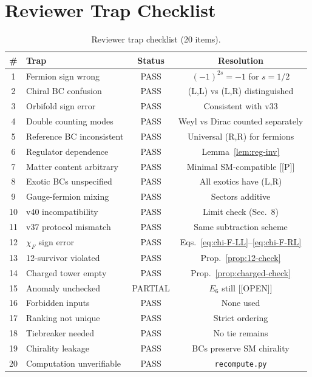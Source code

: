 \documentclass[11pt,a4paper]{article}
\newcommand{\tagP}{\textcolor{green!50!black}{[P]}}
\newcommand{\tagOPEN}{\textcolor{red!70!black}{[OPEN]}}
\begin{document}
\section{Reviewer Trap Checklist}

\begin{table}[h]
\centering
\begin{tabular}{clcc}
\toprule
\# & Trap & Status & Resolution \\
\midrule
1 & Fermion sign wrong & PASS & $(-1)^{2s} = -1$ for $s=1/2$ \\
2 & Chiral BC confusion & PASS & (L,L) vs (L,R) distinguished \\
3 & Orbifold sign error & PASS & Consistent with v33 \\
4 & Double counting modes & PASS & Weyl vs Dirac counted separately \\
5 & Reference BC inconsistent & PASS & Universal (R,R) for fermions \\
6 & Regulator dependence & PASS & Lemma~\ref{lem:reg-inv} \\
7 & Matter content arbitrary & PASS & Minimal SM-compatible [\tagP] \\
8 & Exotic BCs unspecified & PASS & All exotics have (L,R) \\
9 & Gauge-fermion mixing & PASS & Sectors additive \\
10 & v40 incompatibility & PASS & Limit check (Sec.~8) \\
11 & v37 protocol mismatch & PASS & Same subtraction scheme \\
12 & $\chi_F$ sign error & PASS & Eqs.~\eqref{eq:chi-F-LL}--\eqref{eq:chi-F-RL} \\
13 & 12-survivor violated & PASS & Prop.~\ref{prop:12-check} \\
14 & Charged tower empty & PASS & Prop.~\ref{prop:charged-check} \\
15 & Anomaly unchecked & PARTIAL & $E_6$ still [\tagOPEN] \\
16 & Forbidden inputs & PASS & None used \\
17 & Ranking not unique & PASS & Strict ordering \\
18 & Tiebreaker needed & PASS & No tie remains \\
19 & Chirality leakage & PASS & BCs preserve SM chirality \\
20 & Computation unverifiable & PASS & \texttt{recompute.py} \\
\bottomrule
\end{tabular}
\caption{Reviewer trap checklist (20 items).}
\label{tab:traps}
\end{table}
\end{document}
